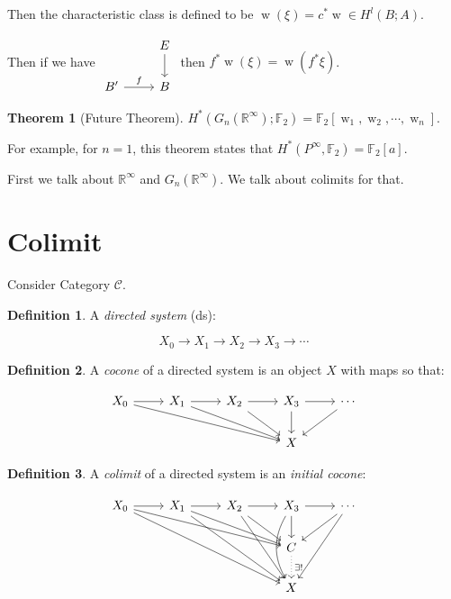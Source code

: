 \documentclass{article}
\theoremstyle{definition}
\newtheorem*{definition}{Definition}
\newtheorem{theorem}{Theorem}
\begin{document}
    Then the characteristic class is defined to be \(\operatorname{w}(\xi) = c^{\ast} \operatorname{w} \in H^l(B;A)\).
    
    Then if we have \(\begin{tikzcd} & E\ar[d] \\ B^{\prime} \ar[r,"f"] & B\end{tikzcd}\) then \(f^{\ast} \operatorname{w} (\xi) = \operatorname{w} (f^{\ast} \xi)\).

    \begin{theorem}
        [Future Theorem] \(H^{\ast} (G_n(\mathbb{R}^{\infty});\mathbb{F}_2) = \mathbb{F}_2[\operatorname{w}_1, \operatorname{w}_2, \cdots ,\operatorname{w}_n]\).
    \end{theorem}

    For example, for \(n = 1\), this theorem states that \(H^{\ast} (P^{\infty}, \mathbb{F}_2) = \mathbb{F}_2[a]\).

    First we talk about \(\mathbb{R}^{\infty}\) and \(G_n(\mathbb{R}^{\infty})\). We talk about colimits for that.

    \section*{Colimit}

    Consider Category \(\mathcal{C}\).

    \begin{definition}
        A \textit{directed system} (ds):

        \[
            X_0 \to X_1 \to X_2 \to X_3 \to \cdots
        \]
    \end{definition}

    \begin{definition}
        A \textit{cocone} of a directed system is an object \(X\) with maps so that:

        \[
            \begin{tikzcd}
                X_0 \ar[rrrd] \ar[r] & X_1 \ar[r] \ar[rrd] & X_2 \ar[r] \ar[rd] & X_3 \ar[r] \ar[d] & \cdots \ar[ld] \\
                & & & X
            \end{tikzcd}
        \]
    \end{definition}

    \begin{definition}
        A \textit{colimit} of a directed system is an \textit{initial cocone}:

        \[
            \begin{tikzcd}
                X_0 \ar[rrrd] \ar[rrrdd] \ar[r] & X_1 \ar[r] \ar[rrd] \ar[rrdd] & X_2 \ar[r] \ar[rd] \ar[rdd] & X_3 \ar[r] \ar[d] \ar[dd, bend right] & \cdots \ar[ld] \ar[ldd] \\
                & & & C \ar[d, dotted, "\exists!"] \\
                & & & X
            \end{tikzcd}
        \]

    \end{definition}
\end{document}
